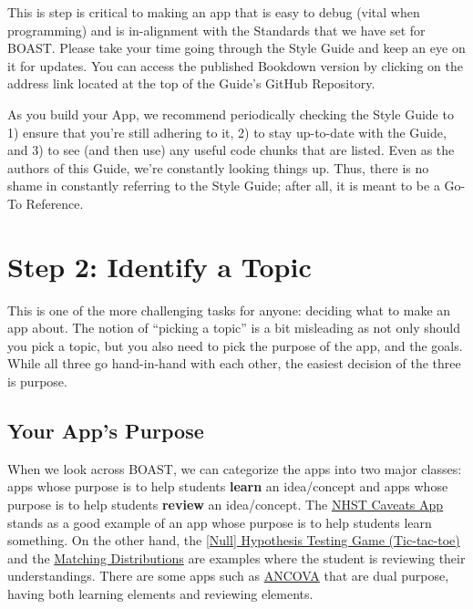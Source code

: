 \documentclass[
]{book}
\begin{document}
This is step is critical to making an app that is easy to debug (vital when programming) and is in-alignment with the Standards that we have set for BOAST. Please take your time going through the Style Guide and keep an eye on it for updates. You can access the published Bookdown version by clicking on the address link located at the top of the Guide's GitHub Repository.

As you build your App, we recommend periodically checking the Style Guide to 1) ensure that you're still adhering to it, 2) to stay up-to-date with the Guide, and 3) to see (and then use) any useful code chunks that are listed. Even as the authors of this Guide, we're constantly looking things up. Thus, there is no shame in constantly referring to the Style Guide; after all, it is meant to be a Go-To Reference.

\hypertarget{step2}{%
\section{Step 2: Identify a Topic}\label{step2}}

This is one of the more challenging tasks for anyone: deciding what to make an app about. The notion of ``picking a topic'' is a bit misleading as not only should you pick a topic, but you also need to pick the purpose of the app, and the goals. While all three go hand-in-hand with each other, the easiest decision of the three is purpose.

\hypertarget{step2a}{%
\subsection{Your App's Purpose}\label{step2a}}

When we look across BOAST, we can categorize the apps into two major classes: apps whose purpose is to help students \textbf{learn} an idea/concept and apps whose purpose is to help students \textbf{review} an idea/concept. The \href{https://psu-eberly.shinyapps.io/Significance_Testing_Caveats/}{NHST Caveats App} stands as a good example of an app whose purpose is to help students learn something. On the other hand, the \href{https://psu-eberly.shinyapps.io/Hypothesis_Testing_Game/}{{[}Null{]} Hypothesis Testing Game (Tic-tac-toe)} and the \href{https://psu-eberly.shinyapps.io/Matching_Distributions/}{Matching Distributions} are examples where the student is reviewing their understandings. There are some apps such as \href{https://psu-eberly.shinyapps.io/ANCOVA/}{ANCOVA} that are dual purpose, having both learning elements and reviewing elements.
\end{document}
